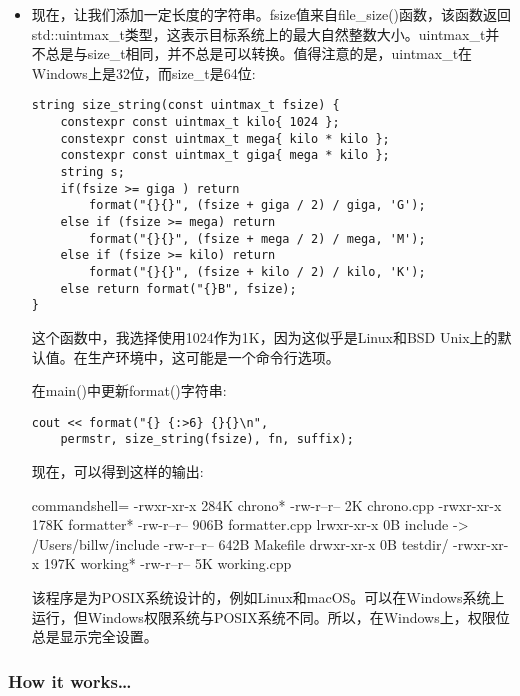 \begin{itemize}
\item 
现在，让我们添加一定长度的字符串。fsize值来自file\_size()函数，该函数返回std::uintmax\_t类型，这表示目标系统上的最大自然整数大小。uintmax\_t并不总是与size\_t相同，并不总是可以转换。值得注意的是，uintmax\_t在Windows上是32位，而size\_t是64位:

\begin{lstlisting}[style=styleCXX]
string size_string(const uintmax_t fsize) {
	constexpr const uintmax_t kilo{ 1024 };
	constexpr const uintmax_t mega{ kilo * kilo };
	constexpr const uintmax_t giga{ mega * kilo };
	string s;
	if(fsize >= giga ) return
		format("{}{}", (fsize + giga / 2) / giga, 'G');
	else if (fsize >= mega) return
		format("{}{}", (fsize + mega / 2) / mega, 'M');
	else if (fsize >= kilo) return
		format("{}{}", (fsize + kilo / 2) / kilo, 'K');
	else return format("{}B", fsize);
}
\end{lstlisting}

这个函数中，我选择使用1024作为1K，因为这似乎是Linux和BSD Unix上的默认值。在生产环境中，这可能是一个命令行选项。

在main()中更新format()字符串:

\begin{lstlisting}[style=styleCXX]
cout << format("{} {:>6} {}{}\n",
	permstr, size_string(fsize), fn, suffix);
\end{lstlisting}

现在，可以得到这样的输出:

\begin{tcblisting}{commandshell={}}
-rwxr-xr-x 284K chrono*
-rw-r--r--   2K chrono.cpp
-rwxr-xr-x 178K formatter*
-rw-r--r-- 906B formatter.cpp
lrwxr-xr-x   0B include -> /Users/billw/include
-rw-r--r-- 642B Makefile
drwxr-xr-x   0B testdir/
-rwxr-xr-x 197K working*
-rw-r--r--   5K working.cpp
\end{tcblisting}

\begin{tcolorbox}[colback=webgreen!5!white,colframe=webgreen!75!black,title=Note]
该程序是为POSIX系统设计的，例如Linux和macOS。可以在Windows系统上运行，但Windows权限系统与POSIX系统不同。所以，在Windows上，权限位总是显示完全设置。
\end{tcolorbox}

\end{itemize}

\subsubsection{How it works…}

